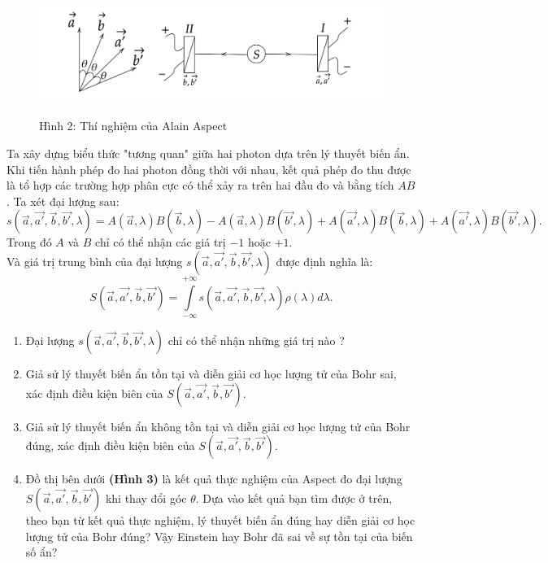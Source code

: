 \begin{enumerate}
\begin{enumerate}[label=\textbf{\alph*,}]
\begin{center}
    \begin{figure}[htp]
    \begin{center}
        \includegraphics[scale=.25
        ]{Problem_15/image/2.png}
    \end{center}
    \begin{center}
    Hình 2: Thí nghiệm của Alain Aspect
    \end{center}
    \end{figure}
\end{center}
Ta xây dựng biểu thức "tương quan" giữa hai photon dựa trên lý thuyết biến ẩn. Khi tiến hành phép đo hai photon đồng thời với nhau, kết quả phép đo thu được là tổ hợp các trường hợp phân cực có thể xảy ra trên hai đầu đo và bằng tích $AB$. Ta xét đại lượng sau:
$$s(\Vec{a},\Vec{a'},\Vec{b},\Vec{b'},\lambda)=A(\Vec{a},\lambda)B(\Vec{b},\lambda)-A(\Vec{a},\lambda)B(\Vec{b'},\lambda)+A(\Vec{a'},\lambda)B(\Vec{b},\lambda)+A(\Vec{a'},\lambda)B(\Vec{b'},\lambda).$$
Trong đó $A$ và $B$ chỉ có thể nhận các giá trị $-1$ hoặc $+1$.\\
Và giá trị trung bình của đại lượng $s(\Vec{a},\Vec{a'},\Vec{b},\Vec{b'},\lambda)$ được định nghĩa là: $$S(\Vec{a},\Vec{a'},\Vec{b},\Vec{b'})=\displaystyle\int\limits_{-\infty}^{+\infty}s(\Vec{a},\Vec{a'},\Vec{b},\Vec{b'},\lambda)\rho(\lambda)d\lambda.$$
\begin{enumerate}
    \item Đại lượng $s(\Vec{a},\Vec{a'},\Vec{b},\Vec{b'},\lambda)$ chỉ có thể nhận những giá trị nào ?
    \item Giả sử lý thuyết biến ẩn tồn tại và diễn giải cơ học lượng tử của Bohr sai, xác định điều kiện biên của $S(\Vec{a},\Vec{a'},\Vec{b},\Vec{b'})$.
    \item Giả sử lý thuyết biến ẩn không tồn tại và diễn giải cơ học lượng tử của Bohr đúng, xác định điều kiện biên của $S(\Vec{a},\Vec{a'},\Vec{b},\Vec{b'})$.
    \item Đồ thị bên dưới \textbf{(Hình 3)} là kết quả thực nghiệm của Aspect đo đại lượng $S(\Vec{a},\Vec{a'},\Vec{b},\Vec{b'})$ khi thay đổi góc $\theta$. Dựa vào kết quả bạn tìm được ở trên, theo bạn từ kết quả thực nghiệm, lý thuyết biến ẩn đúng hay diễn giải cơ học lượng tử của Bohr đúng? Vậy Einstein hay Bohr đã sai về sự tồn tại của biến số ẩn?

\end{enumerate}
\end{enumerate}
\end{enumerate}
